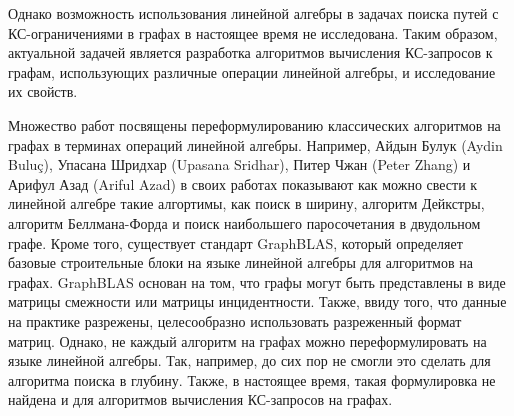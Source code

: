 Однако возможность использования линейной алгебры в задачах поиска путей с КС-ограничениями в графах в настоящее время не исследована. Таким образом, актуальной задачей является разработка алгоритмов вычисления КС-запросов к графам, использующих различные операции линейной алгебры, и исследование их свойств.





{\progress}
Множество работ посвящены переформулированию классических алгоритмов на графах в терминах операций линейной алгебры. Например, Айдын Булук (Aydin Bulu\c{c}), 
Упасана Шридхар (Upasana Sridhar), Питер Чжан (Peter Zhang) и Арифул Азад (Ariful Azad) в своих работах показывают как можно свести к линейной алгебре такие алгортимы, как поиск в ширину, алгоритм Дейкстры, алгоритм Беллмана-Форда и поиск наибольшего паросочетания в двудольном графе. Кроме того, существует стандарт GraphBLAS, который определяет базовые строительные блоки на языке линейной алгебры для алгоритмов на графах. GraphBLAS основан на том, что графы могут быть представлены в виде матрицы смежности или матрицы инцидентности. Также, ввиду того, что данные на практике разрежены, целесообразно использовать разреженный формат матриц. Однако, не каждый алгоритм на графах можно переформулировать на языке линейной алгебры. Так, например, до сих пор не смогли это сделать для алгоритма поиска в глубину. Также, в настоящее время, такая формулировка не найдена и для алгоритмов вычисления КС-запросов на графах.

